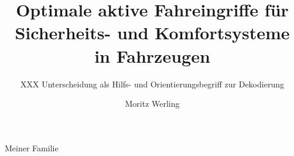 \documentclass[openany,ngerman]{book}
\title{Optimale aktive Fahreingriffe
für Sicherheits- und Komfortsysteme in Fahrzeugen}
\author{Moritz Werling}
\subtitle{XXX Unterscheidung als Hilfs- und Orientierungsbegriff zur Dekodierung}
\begin{document}
%
%


\frontmatter
\maketitle
%

\cleardoublepage%



\vfill \pagebreak %

{\footnotesize

}
\cleardoublepage%
 \vspace*{\fill} %
 \begin{center}
 \large Meiner Familie
 \end{center}
 \vfill\pagebreak %
\tableofcontents 

\cleardoublepage%
%


\mainmatter






	



%











\begin{appendix}  
\cleardoublepage

\end{appendix}


\cleardoublepage


\cleardoublepage
\markboth{}{}%
\listoffigures
\end{document}
